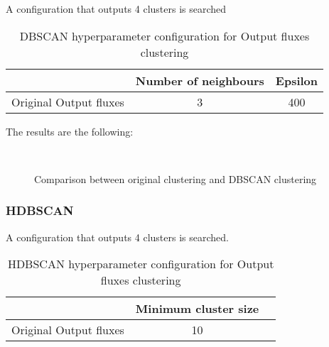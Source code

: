 			A configuration that outputs 4 clusters is searched
			
			\begin{table}[h!]
				\centering
				\begin{tabular}{|c|c|c|}
					\hline
					& \textbf{Number of neighbours} & \textbf{Epsilon}\\
					\hline
					Original Output fluxes & 3 & 400\\
					\hline
				\end{tabular}
				\caption{DBSCAN hyperparameter configuration for Output fluxes clustering}
			\end{table}
		
			The results are the following:
			
			\begin{figure*}[ht!]
				\centering
				\hspace{\fill}
				\\
					
				\hspace{\fill}
				\caption{Comparison between original clustering and DBSCAN clustering}
			\end{figure*}
			\FloatBarrier
		
		\subsubsection{HDBSCAN}
			
			A configuration that outputs 4 clusters is searched.
			
			\begin{table}[h!]
				\centering
				\begin{tabular}{|c|c|c|}
					\hline
					& \textbf{Minimum cluster size} \\
					\hline
					Original Output fluxes & 10 \\
					\hline
				\end{tabular}
				\caption{HDBSCAN hyperparameter configuration for Output fluxes clustering}
			\end{table}
			\FloatBarrier
			
